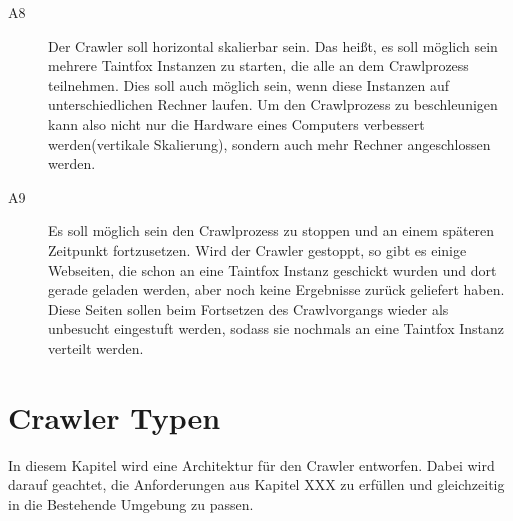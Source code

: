 \begin{description}
	\item[ A8 ] Der Crawler soll horizontal skalierbar sein. Das heißt, es soll möglich sein mehrere Taintfox Instanzen zu starten, die alle an dem Crawlprozess teilnehmen. Dies soll auch möglich sein, wenn diese Instanzen auf unterschiedlichen Rechner laufen.	Um den Crawlprozess zu beschleunigen kann also nicht nur die Hardware eines Computers verbessert werden(vertikale Skalierung), sondern auch mehr Rechner angeschlossen werden.
	\item[ A9 ] Es soll möglich sein den Crawlprozess zu stoppen und an einem späteren Zeitpunkt fortzusetzen. Wird der Crawler gestoppt, so gibt es einige Webseiten, die schon an eine Taintfox Instanz geschickt wurden und dort gerade geladen werden, aber noch keine Ergebnisse zurück geliefert haben. Diese Seiten sollen beim Fortsetzen des Crawlvorgangs wieder als unbesucht eingestuft werden, sodass sie nochmals an eine Taintfox Instanz verteilt werden.
\end{description}

\section{Crawler Typen}
In diesem Kapitel wird eine Architektur für den Crawler entworfen. Dabei wird darauf geachtet, die Anforderungen aus Kapitel XXX zu erfüllen und gleichzeitig in die Bestehende Umgebung zu passen.

